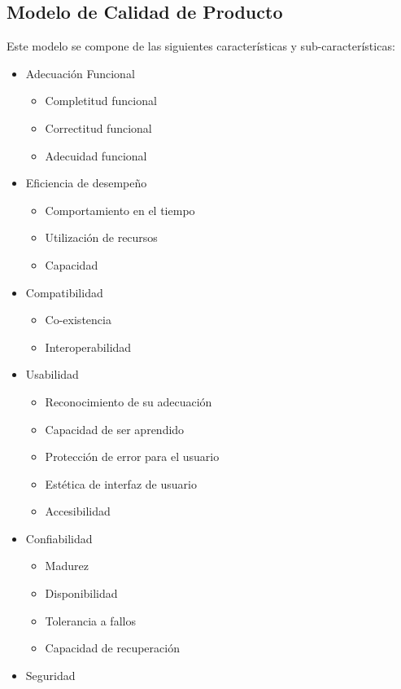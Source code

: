 \subsection{Modelo de Calidad de Producto}
Este modelo se compone de las siguientes características y sub-características:

\begin{itemize}
\item Adecuación Funcional
    \begin{itemize}
        \item Completitud funcional
        \item Correctitud funcional
        \item Adecuidad funcional
    \end{itemize}
\item Eficiencia de desempeño
    \begin{itemize}
        \item Comportamiento en el tiempo
        \item Utilización de recursos
        \item Capacidad
    \end{itemize}
\item Compatibilidad
    \begin{itemize}
        \item Co-existencia
        \item Interoperabilidad
    \end{itemize}
\item Usabilidad
    \begin{itemize}
        \item Reconocimiento de su adecuación
        \item Capacidad de ser aprendido
        \item Protección de error para el usuario
        \item Estética de interfaz de usuario
        \item Accesibilidad
    \end{itemize}
\item Confiabilidad
    \begin{itemize}
        \item Madurez
        \item Disponibilidad
        \item Tolerancia a fallos
        \item Capacidad de recuperación
    \end{itemize}
\item Seguridad

\end{itemize}
